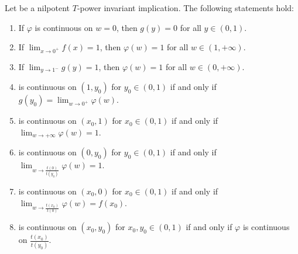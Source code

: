 \begin{proposition}\label{prop:nilpotent:continuity}
	Let \IT be a nilpotent $T$-power invariant implication. The following statements hold:
	\begin{enumerate}[label=(\roman*)]
		\item If $\varphi$ is continuous on $w=0$, then $g(y)=0$ for all $y \in (0,1)$.
		\item If $\displaystyle \lim_{x \to 0^+} f(x)=1$, then $\varphi(w)=1$ for all $w \in (1,+\infty)$.
		\item If $\displaystyle \lim_{y \to 1^-} g(y)=1$, then $\varphi(w)=1$ for all $w \in (0,+\infty)$.
		\item \IT is continuous on $(1,y_0)$ for $y_0 \in (0,1)$ if and only if $\displaystyle g(y_0)=\lim_{w \to 0^+} \varphi(w)$.
		\item \IT is continuous on $(x_0,1)$ for $x_0 \in (0,1)$ if and only if $\displaystyle \lim_{w \to +\infty} \varphi(w)=1$.
		\item \IT is continuous on $(0,y_0)$ for $y_0 \in (0,1)$ if and only if $\displaystyle \lim_{w \to \frac{t(0)}{t(y_0)}} \varphi(w)=1$.
		\item \IT is continuous on $(x_0,0)$ for $x_0 \in (0,1)$ if and only if $\displaystyle \lim_{w \to \frac{t(x_0)}{t(0)}} \varphi(w)=f(x_0)$. 
		\item \IT is continuous on $(x_0,y_0)$ for $x_0,y_0 \in (0,1)$ if and only if $\varphi$ is continuous on $\frac{t(x_0)}{t(y_0)}$.
	\end{enumerate}
\end{proposition}

